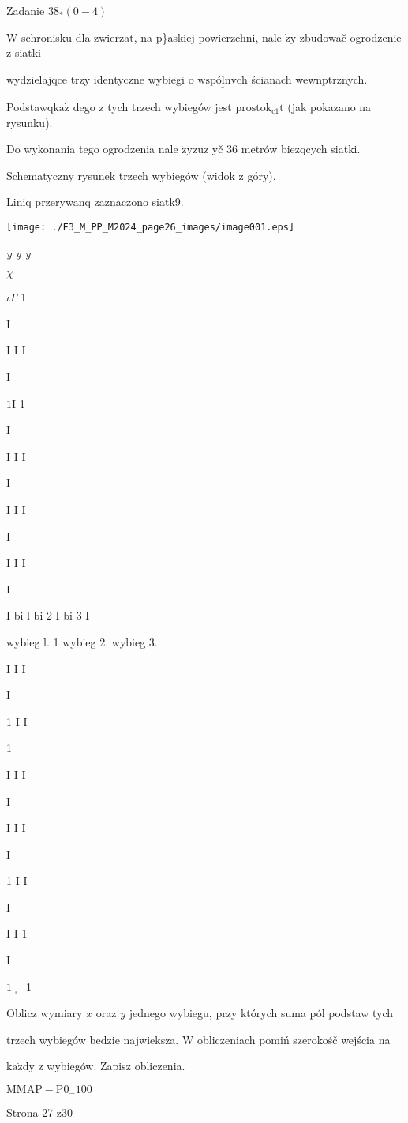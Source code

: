 \documentclass[a4paper,12pt]{article}
\begin{document}
Zadanie $38_{*}(0-4)$

$\mathrm{W}$ schronisku dla zwierzat, na $\mathrm{p}$\}askiej powierzchni, nale $\dot{\mathrm{z}}\mathrm{y}$ zbudowač ogrodzenie z siatki

wydzielajqce trzy identyczne wybiegi o $\underline{\mathrm{w}\mathrm{s}\mathrm{p}\text{ó} \mathrm{l}\mathrm{n}\mathrm{v}\mathrm{c}\mathrm{h}}$ ścianach wewnptrznych.

Podstawq$\mathrm{k}\mathrm{a}\dot{\mathrm{z}}$ dego z tych trzech wybiegów jest $\mathrm{p}\mathrm{r}\mathrm{o}\mathrm{s}\mathrm{t}\mathrm{o}\mathrm{k}_{\mathrm{c}1}\mathrm{t}$ (jak pokazano na rysunku).

Do wykonania tego ogrodzenia nale $\dot{\mathrm{z}}\mathrm{y}\mathrm{z}\mathrm{u}\dot{\mathrm{z}}$ yč 36 metrów biezqcych siatki.

Schematyczny rysunek trzech wybiegów (widok z góry).

Liniq przerywanq zaznaczono siatk9.
\begin{center}
\texttt{[image: ./F3\_M\_PP\_M2024\_page26\_images/image001.eps]}
\end{center}
{\it y y  y}

$\chi$

$\iota \Gamma$ 1

I

I I I

I

$1 \mathrm{I}$ 1

I

I I I

I

I I I

I

I I I

I

I bi l bi 2 I bi 3 I

wybieg l. 1 wybieg 2. wybieg 3.

I I I

I

1 I I

1

I I I

I

I I I

I

1 I I

I

I I 1

I

$1 \llcorner$ 1

Oblicz wymiary $x$ oraz $y$ jednego wybiegu, przy których suma pól podstaw tych

trzech wybiegów bedzie najwieksza. $\mathrm{W}$ obliczeniach pomiń szerokośč wejścia na

$\mathrm{k}\mathrm{a}\dot{\mathrm{z}}\mathrm{d}\mathrm{y}$ z wybiegów. Zapisz obliczenia.

$\mathrm{M}\mathrm{M}\mathrm{A}\mathrm{P}-\mathrm{P}0_{-}100$

Strona 27 z30
\end{document}
